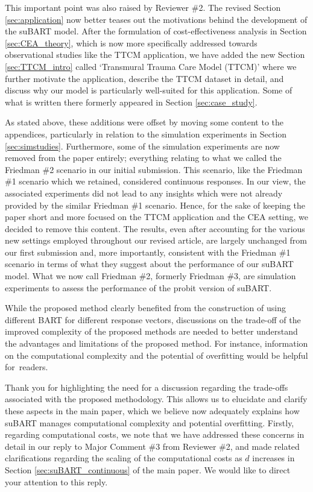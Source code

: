 \documentclass{article}
\begin{document}
This important point was also raised by Reviewer \#2. The revised Section \ref{sec:application} now better teases out the motivations behind the development of the suBART model. After the formulation of cost-effectiveness analysis in Section \ref{sec:CEA_theory}, which is now more specifically addressed towards observational studies like the TTCM application, we have added the new Section \ref{sec:TTCM_intro} called `Transmural Trauma Care Model (TTCM)' where we further motivate the application, describe the TTCM dataset in detail, and discuss why our model is particularly well-suited for this application. Some of what is written there formerly appeared in Section \ref{sec:case_study}. 

As stated above, these additions were offset by moving some content to the appendices, particularly in relation to the simulation experiments in Section \ref{sec:simstudies}. Furthermore, some of the simulation experiments are now removed from the paper entirely; everything relating to what we called the Friedman \#2 scenario in our initial submission. This scenario, like the Friedman \#1 scenario which we retained, considered continuous responses. In our view, the associated experiments did not lead to any insights which were not already provided by the similar Friedman \#1 scenario. Hence, for the sake of keeping the paper short and more focused on the TTCM application and the CEA setting, we decided to remove this content. The results, even after accounting for the various new settings employed throughout our revised article, are largely unchanged from our first submission and, more importantly, consistent with the Friedman \#1 scenario in terms of what they suggest about the performance of our suBART model. What we now call Friedman \#2, formerly Friedman \#3, are simulation experiments to assess the performance of the probit version of suBART.

\begin{mdframed}
While the proposed method clearly benefited from the construction of using different BART for different response vectors, discussions on the trade-off of the improved complexity of the proposed methods are needed to better understand the advantages and limitations of the proposed method. For instance, information on the computational complexity and the potential of overfitting would be helpful for~readers.
\end{mdframed}

Thank you for highlighting the need for a discussion regarding the trade-offs associated with the proposed methodology. This allows us to elucidate and clarify these aspects in the main paper, which we believe  now adequately explains how suBART manages computational complexity and potential overfitting. Firstly, regarding computational costs, we note that we have addressed these concerns in detail in our reply to Major Comment \#3 from Reviewer \#2, and made related clarifications regarding the scaling of the computational costs as $d$ increases in Section \ref{sec:suBART_continuous} of the main paper. We would like to direct your attention to this reply.
\end{document}
